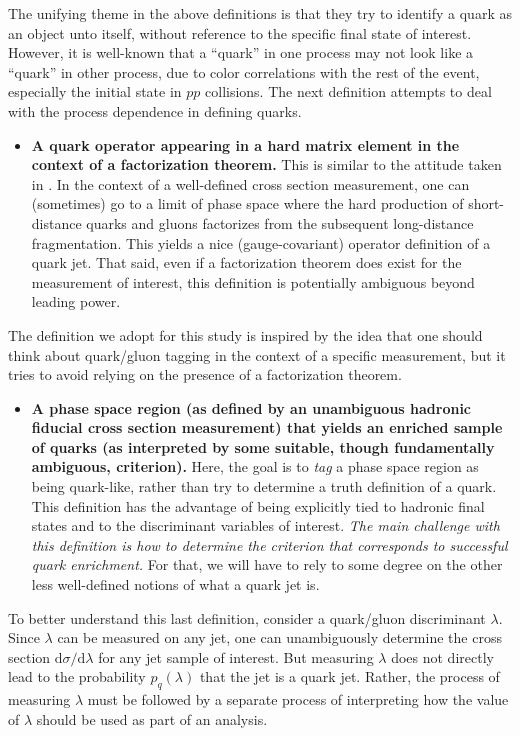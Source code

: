 \documentclass[11pt]{cernrep}
\begin{document}
The unifying theme in the above definitions is that they try to identify a quark as an object unto itself, without reference to the specific final state of interest.  However, it is well-known that a ``quark'' in one process may not look like a ``quark'' in other process, due to color correlations with the rest of the event, especially the initial state in $pp$ collisions.  The next definition attempts to deal with the process dependence in defining quarks. 
\begin{itemize}
\item \textbf{A quark operator appearing in a hard matrix element in the context of a factorization theorem.}  This is similar to the attitude taken in \cite{Gallicchio:2011xc}.  In the context of a well-defined cross section measurement, one can (sometimes) go to a limit of phase space where the hard production of short-distance quarks and gluons factorizes from the subsequent long-distance fragmentation.  This yields a nice (gauge-covariant) operator definition of a quark jet.  That said, even if a factorization theorem does exist for the measurement of interest, this definition is potentially ambiguous beyond leading power.
\end{itemize}
The definition we adopt for this study is inspired by the idea that one should think about quark/gluon tagging in the context of a specific measurement, but it tries to avoid relying on the presence of a factorization theorem.
\begin{itemize}
\item \textbf{A phase space region (as defined by an unambiguous
    hadronic fiducial cross section measurement) that yields an
    enriched sample of quarks (as interpreted by some suitable, though
    fundamentally ambiguous, criterion).}  Here, the goal is to
  \emph{tag} a phase space region as being quark-like, rather than try
  to determine a truth definition of a quark.  This definition has the
  advantage of being explicitly tied to hadronic final states and to
  the discriminant variables of interest. \emph{The main
  challenge with this definition is how to determine the criterion
  that corresponds to successful quark enrichment.}  For that, we will
  have to rely to some degree on the other less well-defined notions
  of what a quark jet is.
\end{itemize}

To better understand this last definition, consider a quark/gluon discriminant $\lambda$.  Since $\lambda$ can be measured on any jet, one can unambiguously determine the cross section $\text{d} \sigma / \text{d} \lambda$ for any jet sample of interest.  But measuring $\lambda$ does not directly lead to the probability $p_q(\lambda)$ that the jet is a quark jet.  Rather, the process of measuring $\lambda$ must be followed by a separate process of interpreting how the value of $\lambda$ should be used as part of an analysis.
\end{document}
